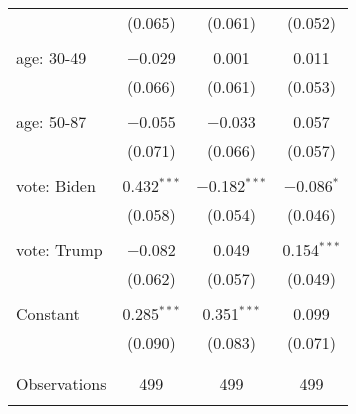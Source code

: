 \begin{tabular}{@{\extracolsep{5pt}}lccc}
  & (0.065) & (0.061) & (0.052) \\ 
  & & & \\ 
 age: 30-49 & $-$0.029 & 0.001 & 0.011 \\ 
  & (0.066) & (0.061) & (0.053) \\ 
  & & & \\ 
 age: 50-87 & $-$0.055 & $-$0.033 & 0.057 \\ 
  & (0.071) & (0.066) & (0.057) \\ 
  & & & \\ 
 vote: Biden & 0.432$^{***}$ & $-$0.182$^{***}$ & $-$0.086$^{*}$ \\ 
  & (0.058) & (0.054) & (0.046) \\ 
  & & & \\ 
 vote: Trump & $-$0.082 & 0.049 & 0.154$^{***}$ \\ 
  & (0.062) & (0.057) & (0.049) \\ 
  & & & \\ 
 Constant & 0.285$^{***}$ & 0.351$^{***}$ & 0.099 \\ 
  & (0.090) & (0.083) & (0.071) \\ 
  & & & \\ 
\hline \\[-1.8ex] 

Observations & 499 & 499 & 499 \\ 
\hline 
\hline \\[-1.8ex] 
\end{tabular} 